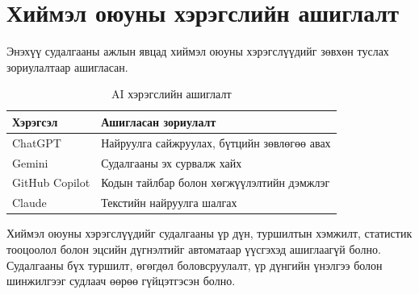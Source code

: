 
\chapter{Хиймэл оюуны хэрэгслийн ашиглалт}
\label{AppendixI}
\pagecolor{white}

Энэхүү судалгааны ажлын явцад хиймэл оюуны хэрэгслүүдийг зөвхөн туслах зориулалтаар ашигласан.

\begin{table}[ht]
    \centering
    \begin{tabular}{|l|l|}
    \hline
    \textbf{Хэрэгсэл} & \textbf{Ашигласан зориулалт} \\ \hline
    ChatGPT        & Найруулга сайжруулах, бүтцийн зөвлөгөө авах \\ \hline
    Gemini         & Судалгааны эх сурвалж хайх \\ \hline
    GitHub Copilot & Кодын тайлбар болон хөгжүүлэлтийн дэмжлэг \\ \hline
    Claude         & Текстийн найруулга шалгах \\ \hline
    \end{tabular}
    \caption{AI хэрэгслийн ашиглалт}
    \label{tab:appI_ai}
\end{table}

Хиймэл оюуны хэрэгслүүдийг судалгааны үр дүн, туршилтын хэмжилт, статистик тооцоолол болон эцсийн дүгнэлтийг автоматаар үүсгэхэд ашиглаагүй болно. Судалгааны бүх туршилт, өгөгдөл боловсруулалт, үр дүнгийн үнэлгээ болон шинжилгээг судлаач өөрөө гүйцэтгэсэн болно.
